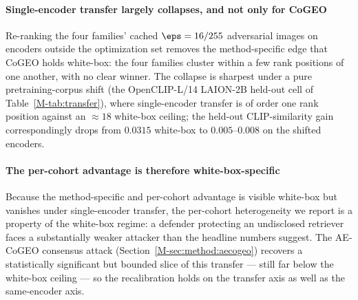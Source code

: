 \paragraph{Single-encoder transfer largely collapses, and not only for CoGEO} Re-ranking the four families' cached $\eps = 16/255$ adversarial images on encoders outside the optimization set removes the method-specific edge that CoGEO holds white-box: the four families cluster within a few rank positions of one another, with no clear winner. The collapse is sharpest under a pure pretraining-corpus shift (the OpenCLIP-L/14 LAION-2B held-out cell of Table~\ref{M-tab:transfer}), where single-encoder transfer is of order one rank position against an $\approx 18$ white-box ceiling; the held-out CLIP-similarity gain correspondingly drops from $0.0315$ white-box to $0.005$--$0.008$ on the shifted encoders.

\paragraph{The per-cohort advantage is therefore white-box-specific} Because the method-specific and per-cohort advantage is visible white-box but vanishes under single-encoder transfer, the per-cohort heterogeneity we report is a property of the white-box regime: a defender protecting an undisclosed retriever faces a substantially weaker attacker than the headline numbers suggest. The AE-CoGEO consensus attack (Section~\ref{M-sec:method:aecogeo}) recovers a statistically significant but bounded slice of this transfer --- still far below the white-box ceiling --- so the recalibration holds on the transfer axis as well as the same-encoder axis.


